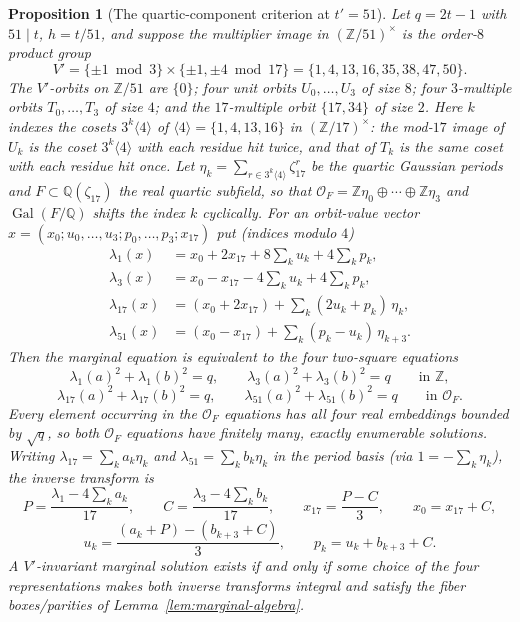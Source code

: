 \documentclass[11pt]{article}
\theoremstyle{plain}
\newtheorem{proposition}[theorem]{Proposition}
\theoremstyle{definition}
\theoremstyle{remark}
\newcommand{\Z}{\mathbb Z}
\newcommand{\Q}{\mathbb Q}
\newcommand{\Gal}{\operatorname{Gal}}
\begin{document}
\begin{proposition}[The quartic-component criterion at $t'=51$]\label{prop:c51-quartic}
Let $q=2t-1$ with $51\mid t$, $h=t/51$, and suppose the multiplier image in
$(\Z/51)^\times$ is the order-$8$ product group
\[
  V'=\{\pm1\bmod3\}\times\{\pm1,\pm4\bmod17\}
    =\{1,4,13,16,35,38,47,50\}.
\]
The $V'$-orbits on $\Z/51$ are $\{0\}$; four unit orbits $U_0,\dots,U_3$ of
size $8$; four $3$-multiple orbits $T_0,\dots,T_3$ of size $4$; and the
$17$-multiple orbit $\{17,34\}$ of size $2$. Here $k$ indexes the cosets
$3^k\langle4\rangle$ of $\langle4\rangle=\{1,4,13,16\}$ in $(\Z/17)^\times$:
the mod-$17$ image of $U_k$ is the coset $3^k\langle4\rangle$ with each residue
hit twice, and that of $T_k$ is the same coset with each residue hit once. Let
$\eta_k=\sum_{r\in3^k\langle4\rangle}\zeta_{17}^r$ be the quartic Gaussian
periods and $F\subset\Q(\zeta_{17})$ the real quartic subfield, so that
$\mathcal O_F=\Z\eta_0\oplus\cdots\oplus\Z\eta_3$ and $\Gal(F/\Q)$ shifts the
index $k$ cyclically. For an orbit-value vector
$x=(x_0;u_0,\dots,u_3;p_0,\dots,p_3;x_{17})$ put (indices modulo $4$)
\[
\begin{aligned}
\lambda_1(x)&=x_0+2x_{17}+8\sum\nolimits_ku_k+4\sum\nolimits_kp_k,\\
\lambda_3(x)&=x_0-x_{17}-4\sum\nolimits_ku_k+4\sum\nolimits_kp_k,\\
\lambda_{17}(x)&=(x_0+2x_{17})+\sum\nolimits_k(2u_k+p_k)\,\eta_k,\\
\lambda_{51}(x)&=(x_0-x_{17})+\sum\nolimits_k(p_k-u_k)\,\eta_{k+3}.
\end{aligned}
\]
Then the marginal equation is equivalent to the four two-square equations
\[
  \lambda_1(a)^2+\lambda_1(b)^2=q,\qquad
  \lambda_3(a)^2+\lambda_3(b)^2=q\qquad\text{in }\Z,
\]
\[
  \lambda_{17}(a)^2+\lambda_{17}(b)^2=q,\qquad
  \lambda_{51}(a)^2+\lambda_{51}(b)^2=q\qquad\text{in }\mathcal O_F .
\]
Every element occurring in the $\mathcal O_F$ equations has all four real
embeddings bounded by $\sqrt q$, so both $\mathcal O_F$ equations have finitely
many, exactly enumerable solutions. Writing $\lambda_{17}=\sum_ka_k\eta_k$ and
$\lambda_{51}=\sum_kb_k\eta_k$ in the period basis (via
$1=-\sum_k\eta_k$), the inverse transform is
\[
  P=\frac{\lambda_1-4\sum_ka_k}{17},\qquad
  C=\frac{\lambda_3-4\sum_kb_k}{17},\qquad
  x_{17}=\frac{P-C}{3},\qquad x_0=x_{17}+C,
\]
\[
  u_k=\frac{(a_k+P)-(b_{k+3}+C)}{3},\qquad
  p_k=u_k+b_{k+3}+C .
\]
A $V'$-invariant marginal solution exists if and only if some choice of the
four representations makes both inverse transforms integral and satisfy the
fiber boxes/parities of Lemma~\ref{lem:marginal-algebra}.
\end{proposition}
\end{document}
